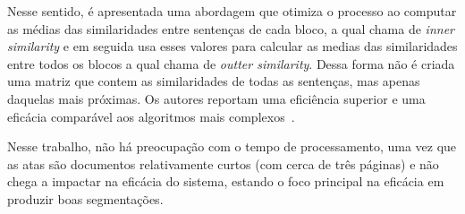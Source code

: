 Nesse sentido, é apresentada uma abordagem que otimiza o processo ao computar as médias das similaridades entre sentenças de cada bloco, a qual chama de \textit{inner similarity} e em seguida usa esses valores para calcular as medias das similaridades entre todos os blocos a qual chama de \textit{outter similarity}. Dessa forma não é criada uma matriz que contem as similaridades de todas as sentenças, mas apenas daquelas mais próximas. Os autores reportam uma eficiência superior e uma eficácia comparável aos algoritmos mais complexos~\cite{Kern2009}.

Nesse trabalho, não há preocupação com o tempo de processamento, uma vez que as atas são documentos relativamente curtos (com cerca de três páginas) e não chega a impactar na eficácia do sistema, estando o foco principal na eficácia em produzir boas segmentações.

% 










